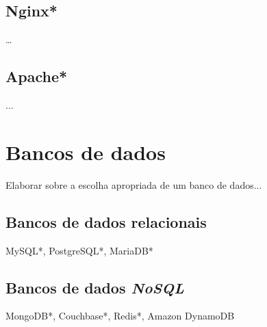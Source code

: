 \subsection{Nginx*}
\dots

\subsection{Apache*}
...

\section{Bancos de dados}
Elaborar sobre a escolha apropriada de um banco de dados...


 
\subsection{Bancos de dados relacionais}
MySQL*, PostgreSQL*, MariaDB*

\subsection{Bancos de dados \emph{NoSQL}}
MongoDB*, Couchbase*, Redis*, Amazon DynamoDB

